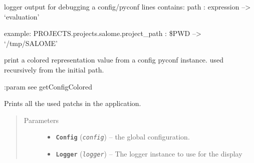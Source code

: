 \documentclass[a4paper,10pt,english]{sphinxmanual}
\begin{document}

\begin{fulllineitems}
\label{commands/apidoc/src:src.configManager.print_debug}
logger output for debugging a config/pyconf
lines contains: path : expression --\textgreater{} `evaluation'

example:
PROJECTS.projects.salome.project\_path : \$PWD --\textgreater{} `/tmp/SALOME'

\end{fulllineitems}


\begin{fulllineitems}
\label{commands/apidoc/src:src.configManager.print_value}
print a colored representation value from a config pyconf instance.
used recursively from the initial path.

:param see getConfigColored

\end{fulllineitems}


\begin{fulllineitems}
\label{commands/apidoc/src:src.configManager.show_patchs}
Prints all the used patchs in the application.
\begin{quote}\begin{description}
\item[{Parameters}] \leavevmode\begin{itemize}
\item {} 
\textbf{\texttt{Config}} (\emph{\texttt{config}}) -- the global configuration.

\item {} 
\textbf{\texttt{Logger}} (\emph{\texttt{logger}}) -- The logger instance to use for the display

\end{itemize}

\end{description}\end{quote}

\end{fulllineitems}
\end{document}
